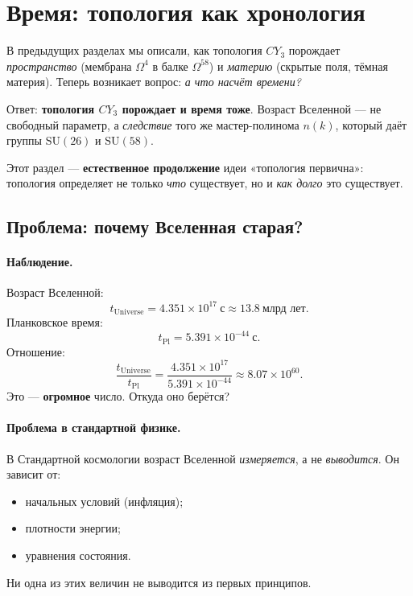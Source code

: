 \documentclass[11pt,a4paper]{article}
\newcommand{\SU}{\mathrm{SU}}
\newcommand{\CY}{CY_3}
\newcommand{\Om}{\Omega^4}
\newcommand{\Omfi}{\Omega^{58}}
\theoremstyle{definition}
\begin{document}
\section{Время: топология как хронология}
\label{sec:time}

В предыдущих разделах мы описали, как топология $\CY$ порождает 
\emph{пространство} (мембрана $\Om$ в балке $\Omfi$) и 
\emph{материю} (скрытые поля, тёмная материя). Теперь возникает 
вопрос: \emph{а что насчёт времени?}

Ответ: \textbf{топология $\CY$ порождает и время тоже}. Возраст 
Вселенной — не свободный параметр, а \emph{следствие} того же 
мастер-полинома $n(k)$, который даёт группы $\SU(26)$ и $\SU(58)$.

Этот раздел — \textbf{естественное продолжение} идеи «топология 
первична»: топология определяет не только \emph{что} существует, 
но и \emph{как долго} это существует.

\subsection{Проблема: почему Вселенная старая?}
\label{subsec:time-problem}

\paragraph{Наблюдение.}
Возраст Вселенной:
\begin{equation}
    t_{\text{Universe}} = 4.351 \times 10^{17}~\text{с}
    \approx 13.8~\text{млрд лет}.
\end{equation}
Планковское время:
\begin{equation}
    t_{\text{Pl}} = 5.391 \times 10^{-44}~\text{с}.
\end{equation}
Отношение:
\begin{equation}
    \frac{t_{\text{Universe}}}{t_{\text{Pl}}} 
    = \frac{4.351 \times 10^{17}}{5.391 \times 10^{-44}}
    \approx 8.07 \times 10^{60}.
\end{equation}
Это — \textbf{огромное} число. Откуда оно берётся?

\paragraph{Проблема в стандартной физике.}
В Стандартной космологии возраст Вселенной \emph{измеряется}, а 
не \emph{выводится}. Он зависит от:
\begin{itemize}
    \item начальных условий (инфляция);
    \item плотности энергии;
    \item уравнения состояния.
\end{itemize}
Ни одна из этих величин не выводится из первых принципов.
\end{document}
